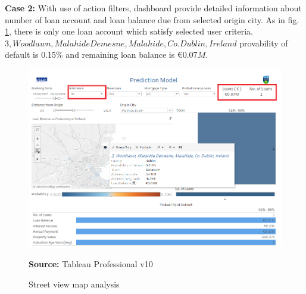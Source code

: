 \textbf{Case 2:} With use of action filters, dashboard provide detailed information about number of loan account and loan balance due from selected origin city. As in fig. \ref{fig:mala}, there is only one loan account which satisfy selected user criteria. $ 3, Woodlawn, Malahide Demesne, Malahide, Co. Dublin, Ireland$ provability of default is 0.15\% and remaining loan balance is $€0.07M$.  

\begin{center}
\begin{figure}[!htb]
\includegraphics[width=\textwidth]{mala.png}
\centering
\caption{Street view map analysis}{\textbf{Source:} Tableau Professional v10}
\label{fig:mala}
\end{figure}
\end{center}








